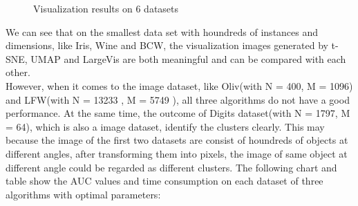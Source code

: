 \begin{figure}[H]
\centering  %
\caption{Visualization results on 6 datasets}
\end{figure}

\noindent We can see that on the smallest data set with houndreds of instances and dimensions, like Iris, Wine and BCW, the visualization images generated by t-SNE, UMAP and LargeVis are both meaningful and can be compared with each other. \\

\noindent However, when it comes to the image dataset, like Oliv(with N = 400, M = 1096) and LFW(with N = 13233 , M = 5749 ), all three algorithms do not have a good performance. At the same time, the outcome of Digits dataset(with N = 1797, M = 64), which is also a image dataset, identify the clusters clearly. This may because the image of the first two datasets are consist of houndreds of objects at different angles, after transforming them into pixels, the image of same object at different angle could be regarded as different clusters. The following chart and table show the AUC values and time consumption on each dataset of three algorithms with optimal parameters:\\
\\

